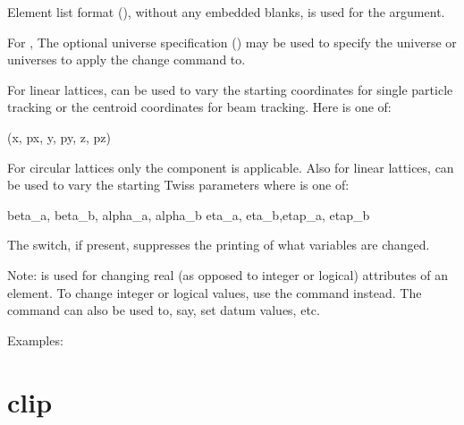Element list format (), without any embedded
blanks, is used for the  argument.

For , The optional 
universe specification () may be used to specify the
universe or universes to apply the change command to.

For linear lattices,  
can be used to vary the starting coordinates for single particle tracking or the
centroid coordinates for beam tracking. Here  is one of: 
\begin{example}
  (x, px, y, py, z, pz)
\end{example}
For circular lattices only the  component is applicable. 
Also for linear lattices,  can be used to
vary the starting Twiss parameters where  is one of:  
\begin{example}
  beta_a, beta_b, alpha_a, alpha_b 
  eta_a, eta_b,etap_a, etap_b    
\end{example}

The  switch, if present, suppresses the printing of what
variables are changed.

Note:  is used for changing real (as opposed to
integer or logical) attributes of an element. To change integer or
logical values, use the  command instead. The 
command can also be used to, say, set datum values, etc.

Examples:


\section{clip}
\label{s:clip}

